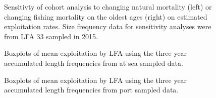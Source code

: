\documentclass[11pt]{article}
\newcommand{\e}{/backup/bio_data/bio.lobster/figures/} %
\begin{document}
\begin{figure}
\centering
              \caption{Sensitivty of cohort analysis to changing natural mortality (left) or changing fishing mortality on the oldest ages (right) on estimated exploitation rates. Size frequency data for sensitivity analyses were from LFA 33 sampled in 2015.}
\end{figure}


\begin{figure}
\centering
              \caption{Boxplots of mean exploitation by LFA using the three year accumulated length frequencies from at sea sampled data.}
\end{figure}

\begin{figure}
\centering
              \caption{Boxplots of mean exploitation by LFA using the three year accumulated length frequencies from port sampled data.}
\end{figure}
\end{document}
